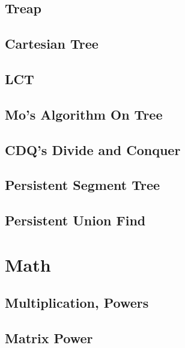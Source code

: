 \subsection{Treap}
\raggedbottom
\hrulefill
\subsection{Cartesian Tree}
\raggedbottom
\hrulefill
\subsection{LCT}
\raggedbottom
\hrulefill
\subsection{Mo's Algorithm On Tree}
\raggedbottom
\hrulefill
\subsection{CDQ's Divide and Conquer}
\raggedbottom
\hrulefill
\subsection{Persistent Segment Tree}
\raggedbottom
\hrulefill
\subsection{Persistent Union Find}
\raggedbottom
\hrulefill

\section{Math}
\subsection{Multiplication, Powers}
\raggedbottom
\hrulefill
\subsection{Matrix Power}
\raggedbottom
\hrulefill
